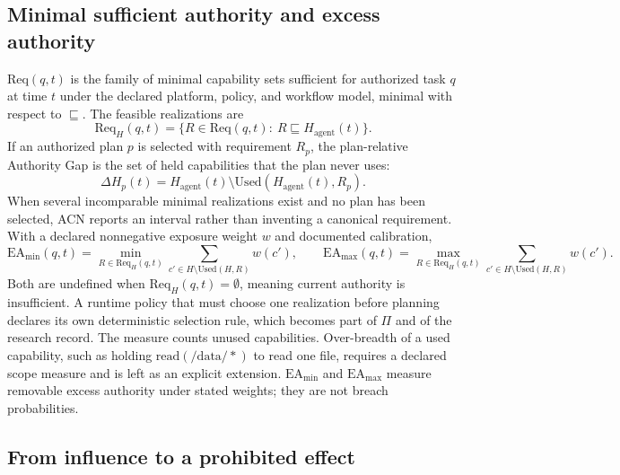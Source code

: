 \documentclass[11pt,letterpaper]{article}
\theoremstyle{definition}
\begin{document}
\subsection{Minimal sufficient authority and excess authority}

$\mathrm{Req}(q,t)$ is the family of minimal capability sets sufficient for authorized task $q$ at time $t$ under the declared platform, policy, and workflow model, minimal with respect to $\sqsubseteq$. The feasible realizations are
\begin{equation}
\mathrm{Req}_H(q,t)=\{R\in\mathrm{Req}(q,t):\ R\sqsubseteq H_{\mathrm{agent}}(t)\}.
\end{equation}
If an authorized plan $p$ is selected with requirement $R_p$, the plan-relative Authority Gap is the set of held capabilities that the plan never uses:
\begin{equation}
\Delta H_p(t)=H_{\mathrm{agent}}(t)\setminus\mathrm{Used}(H_{\mathrm{agent}}(t),R_p).
\end{equation}
When several incomparable minimal realizations exist and no plan has been selected, ACN reports an interval rather than inventing a canonical requirement. With a declared nonnegative exposure weight $w$ and documented calibration,
\begin{equation}\label{eq:ea}
\mathrm{EA}_{\min}(q,t)=\min_{R\in\mathrm{Req}_H(q,t)}\sum_{c'\in H\setminus\mathrm{Used}(H,R)} w(c'),\qquad
\mathrm{EA}_{\max}(q,t)=\max_{R\in\mathrm{Req}_H(q,t)}\sum_{c'\in H\setminus\mathrm{Used}(H,R)} w(c').
\end{equation}
Both are undefined when $\mathrm{Req}_H(q,t)=\emptyset$, meaning current authority is insufficient. A runtime policy that must choose one realization before planning declares its own deterministic selection rule, which becomes part of $\Pi$ and of the research record. The measure counts unused capabilities. Over-breadth of a used capability, such as holding $\mathrm{read}(/\mathrm{data}/*)$ to read one file, requires a declared scope measure and is left as an explicit extension. $\mathrm{EA}_{\min}$ and $\mathrm{EA}_{\max}$ measure removable excess authority under stated weights; they are not breach probabilities.

\subsection{From influence to a prohibited effect}
\end{document}
